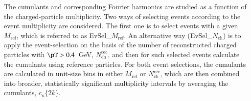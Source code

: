 \documentclass[cernpreprint,texlive=2014,txfonts,UKenglish]{latex/atlasdoc}
\begin{document}
The cumulants and corresponding Fourier harmonics are studied as a function of the charged-particle multiplicity. Two ways of selecting events according to the event multiplicity are considered. The first one is to select events with a given $M_{\mathrm{ref}}$, which is referred to as EvSel\_$M_{\mathrm{ref}}$. An alternative way (EvSel\_$N_{\mathrm{ch}}$) is to apply the event-selection on the basis of the number of reconstructed charged particles with $\pT > 0.4$~GeV, $N_{\mathrm{ch}}^{\mathrm{rec}}$, and then for such selected events calculate the cumulants using reference particles. For both event selections,  the cumulants are calculated in unit-size bins in either $M_{\mathrm{ref}}$ or $N_{\mathrm{ch}}^{\mathrm{rec}}$, which are then combined into broader, statistically significant multiplicity intervals by averaging the cumulants, $c_n\{2k\}$. 
\end{document}
